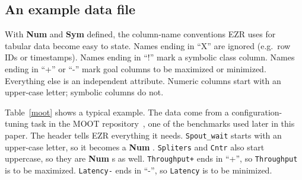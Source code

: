 \documentclass[AMA,STIX2COL]{WileyNJDv5}
\newcommand{\IT}{{\sffamily EZR}}
\newcommand{\cls}[1]{%
  \setlength{\fboxsep}{1.5pt}%
  \colorbox{clsbg}{\sffamily\bfseries{#1}}%
}
\begin{document}
\subsection{An example data file}\label{details}

With \cls{Num} and \cls{Sym} defined, the column-name
conventions \IT{} uses for tabular data become easy to state.
Names ending in ``X'' are ignored (e.g.\ row IDs or timestamps).
Names ending in ``!'' mark a symbolic class column. Names
ending in ``+'' or ``-'' mark goal columns to be maximized or
minimized. Everything else is an independent attribute. Numeric
columns start with an upper-case letter; symbolic columns do
not.

Table~\ref{moot} shows a typical example. The data come from a
configuration-tuning task in the MOOT
repository~\cite{menzies2025moot}, one of the benchmarks used
later in this paper. The header tells \IT{} everything it
needs. \texttt{Spout\_wait} starts with an upper-case letter, so
it becomes a \cls{Num}. \texttt{Spliters} and \texttt{Cntr} also
start uppercase, so they are \cls{Num}s as well.
\texttt{Throughput+} ends in ``+'', so \texttt{Throughput} is to
be maximized. \texttt{Latency-} ends in ``-'', so
\texttt{Latency} is to be minimized.
\end{document}

